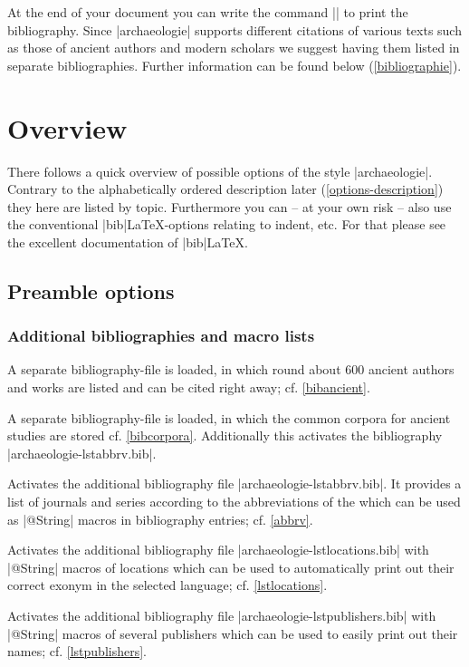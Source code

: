 \documentclass[a4paper,
10pt,
greek,
french,
spanish,
italian,
ngerman,
english
]{ltxdoc}
\begin{document}
At the end of your document you can write the command |\printbibliography| to print 
the bibliography. 
Since |archaeologie| supports different citations of various texts such as those of ancient authors and  modern scholars we suggest  having them listed in separate bibliographies. 
Further information can be found below   (\cref{bibliographie}).

\section{Overview}\label{overview}
There follows a quick overview of possible options of the style |archaeologie|. 
Contrary to the alphabetically ordered description later (\cref{options-description}) they here are listed by topic.
Furthermore you can -- at your own risk -- also use the conventional |bib|\LaTeX-options relating to indent, etc. 
For that please see the excellent documentation of  |bib|\LaTeX.

\subsection{Preamble options}\label{preamble_options}
\subsubsection{Additional bibliographies and macro lists}
A separate bibliography-file is loaded, in which round about 
600 ancient authors and works are listed and can be cited right away; cf. \cref{bibancient}.

A separate bibliography-file is loaded, in which the common corpora for ancient studies are stored cf. \cref{bibcorpora}.
Additionally this activates the bibliography |archaeologie-lstabbrv.bib|.

Activates the additional bibliography file |archaeologie-lstabbrv.bib|.
It provides a list of journals and series according to the abbreviations of the 
\DAI which can be used as |@String| macros in bibliography entries; cf. \cref{abbrv}. 

Activates the additional bibliography file |archaeologie-lstlocations.bib|
with |@String| macros of locations which can be used to automatically print out their correct exonym in the selected language; cf. \cref{lstlocations}.

Activates the additional bibliography file |archaeologie-lstpublishers.bib| with |@String| macros 
of several publishers which can be used to easily print out their names; cf. \cref{lstpublishers}.
\end{document}
